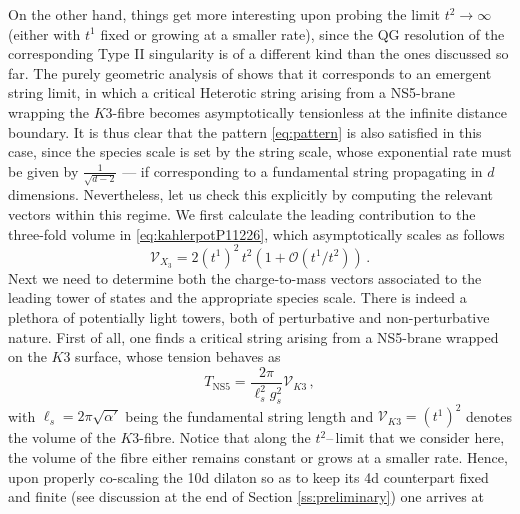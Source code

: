 On the other hand, things get more interesting upon probing the limit $t^2 \to \infty$ (either with $t^1$ fixed or growing at a smaller rate), since the QG resolution of the corresponding Type II singularity is of a different kind than the ones discussed so far. The purely geometric analysis of \cite{Lee:2019wij} shows that it  corresponds to an emergent string limit, in which a critical Heterotic string arising from a NS5-brane wrapping the $K3$-fibre \cite{Harvey:1995rn} becomes asymptotically tensionless at the infinite distance boundary. It is thus clear that the pattern \eqref{eq:pattern} is also satisfied in this case, since the species scale is set by the string scale, whose exponential rate must be given by $\frac{1}{\sqrt{d-2}}$ --- if corresponding to a fundamental string propagating in $d$ dimensions. Nevertheless, let us check this explicitly by computing the relevant vectors within this regime. We first calculate the leading contribution to the three-fold volume in \eqref{eq:kahlerpotP11226}, which asymptotically scales as follows 
%
\begin{equation}\label{eq:volTypeIIlimit}
	\mathcal{V}_{X_3} = 2 (t^1)^2\, t^2 \left(1 + \mathcal{O}\left(t^1/t^2\right) \right)\, .
\end{equation}
%
Next we need to determine both the charge-to-mass vectors associated to the leading tower of states and the appropriate species scale. There is indeed a plethora of potentially light towers, both of perturbative and non-perturbative nature. First of all, one finds a critical string arising from a NS5-brane wrapped on the $K3$ surface, whose tension behaves as
%
\begin{equation}
	T_{\text{NS5}} = \frac{2\pi}{ \ell_s^2 g_s^2} \mathcal{V}_{K3}\, ,
\end{equation}
%
with $\ell_s = 2\pi \sqrt{\alpha'}$ being the fundamental string length and $\mathcal{V}_{K3}= (t^1)^2$ denotes the volume of the $K3$-fibre. Notice that along the $t^2$--\,limit that we consider here, the volume of the fibre either remains constant or grows at a smaller rate. %
Hence, upon properly co-scaling the 10d dilaton so as to keep its 4d counterpart fixed and finite (see discussion at the end of Section \ref{ss:preliminary}) one arrives at %
